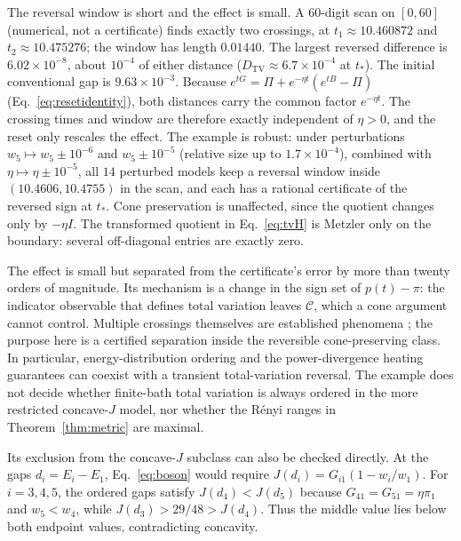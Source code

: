 \documentclass[11pt,a4paper]{article}
\theoremstyle{remark}\newtheorem{remark}[theorem]{Remark}
\newcommand{\C}{\mathcal C}
\newcommand{\TV}{D_{\mathrm{TV}}}
\begin{document}
The reversal window is short and the effect is small. A 60-digit scan on $[0,60]$ (numerical, not a certificate) finds exactly two crossings, at $t_1\approx10.460872$ and $t_2\approx10.475276$; the window has length $0.01440$. The largest reversed difference is $6.02\times10^{-8}$, about $10^{-4}$ of either distance ($\TV\approx6.7\times10^{-4}$ at $t_*$). The initial conventional gap is $9.63\times10^{-3}$. Because $e^{tG}=\Pi+e^{-\eta t}(e^{tB}-\Pi)$ (Eq.~\eqref{eq:resetidentity}), both distances carry the common factor $e^{-\eta t}$. The crossing times and window are therefore exactly independent of $\eta>0$, and the reset only rescales the effect. The example is robust: under perturbations $w_5\mapsto w_5\pm10^{-6}$ and $w_5\pm10^{-5}$ (relative size up to $1.7\times10^{-4}$), combined with $\eta\mapsto\eta\pm10^{-5}$, all $14$ perturbed models keep a reversal window inside $(10.4606,10.4755)$ in the scan, and each has a rational certificate of the reversed sign at $t_*$. Cone preservation is unaffected, since the quotient changes only by $-\eta I$. The transformed quotient in Eq.~\eqref{eq:tvH} is Metzler only on the boundary: several off-diagonal entries are exactly zero.

The effect is small but separated from the certificate's error by more than twenty orders of magnitude. Its mechanism is a change in the sign set of $p(t)-\pi$: the indicator observable that defines total variation leaves $\C$, which a cone argument cannot control. Multiple crossings themselves are established phenomena \cite{Salazar2026}; the purpose here is a certified separation inside the reversible cone-preserving class. In particular, energy-distribution ordering and the power-divergence heating guarantees can coexist with a transient total-variation reversal. The example does not decide whether finite-bath total variation is always ordered in the more restricted concave-$J$ model, nor whether the R\'enyi ranges in Theorem~\ref{thm:metric} are maximal.

Its exclusion from the concave-$J$ subclass can also be checked directly. At the gaps $d_i=E_i-E_1$, Eq.~\eqref{eq:boson} would require $J(d_i)=G_{i1}(1-w_i/w_1)$. For $i=3,4,5$, the ordered gaps satisfy $J(d_4)<J(d_5)$ because $G_{41}=G_{51}=\eta\pi_1$ and $w_5<w_4$, while $J(d_3)>29/48>J(d_4)$. Thus the middle value lies below both endpoint values, contradicting concavity.
\end{document}
